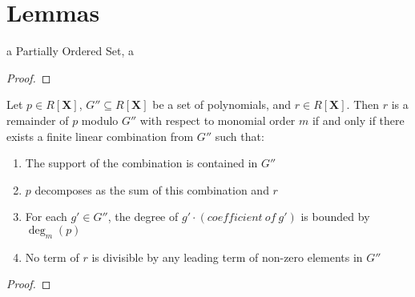     \chapter{Lemmas}
    
        \begin{lemma}\label{zero_le}
          
          \leanok
          a \in Partially Ordered Set, a 

        \end{lemma}
        
        \begin{proof}
          
          \leanok
        \end{proof}
        

        \begin{lemma}\label{IsRemainder_def’}
          \leanok
          Let $p \in R[\mathbf{X}]$, $G'' \subseteq R[\mathbf{X}]$ be a set of polynomials,
and $r \in R[\mathbf{X}]$. Then $r$ is a remainder of $p$ modulo $G''$ with respect to
monomial order $m$ if and only if there exists a finite linear combination from $G''$
such that:
\begin{enumerate}
  \item The support of the combination is contained in $G''$
  \item $p$ decomposes as the sum of this combination and $r$
  \item For each $g' \in G''$, the degree of $g' \cdot (coefficient\ of\ g')$
        is bounded by $\deg_m(p)$
  \item No term of $r$ is divisible by any leading term of non-zero elements in $G''$
\end{enumerate}

        \end{lemma}
        
        \begin{proof}
          
          \leanok
        \end{proof}
        

